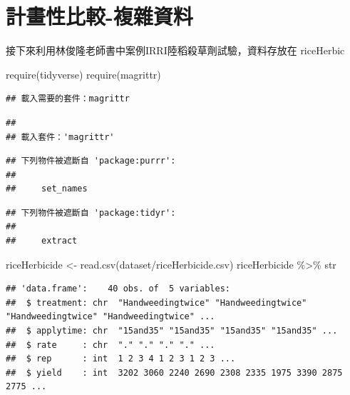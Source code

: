 \documentclass[
]{book}
\newenvironment{Shaded}{\begin{snugshade}}{\end{snugshade}}
\newcommand{\FunctionTok}[1]{\textcolor[rgb]{0.00,0.00,0.00}{#1}}
\newcommand{\NormalTok}[1]{#1}
\newcommand{\OtherTok}[1]{\textcolor[rgb]{0.56,0.35,0.01}{#1}}
\newcommand{\SpecialCharTok}[1]{\textcolor[rgb]{0.00,0.00,0.00}{#1}}
\newcommand{\StringTok}[1]{\textcolor[rgb]{0.31,0.60,0.02}{#1}}
\begin{document}
\hypertarget{ux8a08ux756bux6027ux6bd4ux8f03-ux8907ux96dcux8cc7ux6599}{%
\section{計畫性比較-複雜資料}\label{ux8a08ux756bux6027ux6bd4ux8f03-ux8907ux96dcux8cc7ux6599}}

接下來利用林俊隆老師書中案例IRRI陸稻殺草劑試驗，資料存放在 riceHerbic

\begin{Shaded}
\begin{Highlighting}[]
\FunctionTok{require}\NormalTok{(tidyverse)}
\FunctionTok{require}\NormalTok{(magrittr)}
\end{Highlighting}
\end{Shaded}

\begin{verbatim}
## 載入需要的套件：magrittr
\end{verbatim}

\begin{verbatim}
## 
## 載入套件：'magrittr'
\end{verbatim}

\begin{verbatim}
## 下列物件被遮斷自 'package:purrr':
## 
##     set_names
\end{verbatim}

\begin{verbatim}
## 下列物件被遮斷自 'package:tidyr':
## 
##     extract
\end{verbatim}

\begin{Shaded}
\begin{Highlighting}[]
\NormalTok{riceHerbicide }\OtherTok{\textless{}{-}} \FunctionTok{read.csv}\NormalTok{(}\StringTok{\textquotesingle{}dataset/riceHerbicide.csv\textquotesingle{}}\NormalTok{)}
\NormalTok{riceHerbicide }\SpecialCharTok{\%\textgreater{}\%}\NormalTok{ str}
\end{Highlighting}
\end{Shaded}

\begin{verbatim}
## 'data.frame':    40 obs. of  5 variables:
##  $ treatment: chr  "Handweedingtwice" "Handweedingtwice" "Handweedingtwice" "Handweedingtwice" ...
##  $ applytime: chr  "15and35" "15and35" "15and35" "15and35" ...
##  $ rate     : chr  "." "." "." "." ...
##  $ rep      : int  1 2 3 4 1 2 3 1 2 3 ...
##  $ yield    : int  3202 3060 2240 2690 2308 2335 1975 3390 2875 2775 ...
\end{verbatim}
\end{document}
